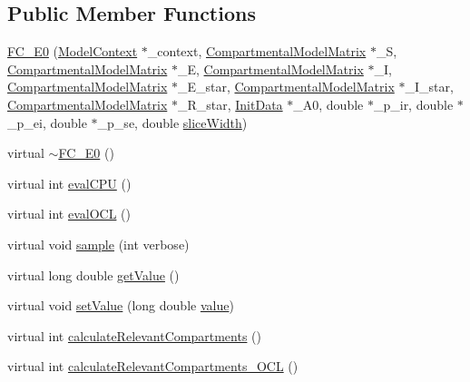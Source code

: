 \subsection*{Public Member Functions}
\begin{DoxyCompactItemize}
\item 
\hyperlink{classSpatialSEIR_1_1FC__E0_af49361f736866374bc4d7c568c443da7}{F\-C\-\_\-\-E0} (\hyperlink{classSpatialSEIR_1_1ModelContext}{Model\-Context} $\ast$\-\_\-context, \hyperlink{classSpatialSEIR_1_1CompartmentalModelMatrix}{Compartmental\-Model\-Matrix} $\ast$\-\_\-\-S, \hyperlink{classSpatialSEIR_1_1CompartmentalModelMatrix}{Compartmental\-Model\-Matrix} $\ast$\-\_\-\-E, \hyperlink{classSpatialSEIR_1_1CompartmentalModelMatrix}{Compartmental\-Model\-Matrix} $\ast$\-\_\-\-I, \hyperlink{classSpatialSEIR_1_1CompartmentalModelMatrix}{Compartmental\-Model\-Matrix} $\ast$\-\_\-\-E\-\_\-star, \hyperlink{classSpatialSEIR_1_1CompartmentalModelMatrix}{Compartmental\-Model\-Matrix} $\ast$\-\_\-\-I\-\_\-star, \hyperlink{classSpatialSEIR_1_1CompartmentalModelMatrix}{Compartmental\-Model\-Matrix} $\ast$\-\_\-\-R\-\_\-star, \hyperlink{classSpatialSEIR_1_1InitData}{Init\-Data} $\ast$\-\_\-\-A0, double $\ast$\-\_\-p\-\_\-ir, double $\ast$\-\_\-p\-\_\-ei, double $\ast$\-\_\-p\-\_\-se, double \hyperlink{classSpatialSEIR_1_1FullConditional_a150ee031af8d086ad0a04b13630a110f}{slice\-Width})
\item 
virtual \hyperlink{classSpatialSEIR_1_1FC__E0_adc32c559bbb774d1c361a4f830856cb1}{$\sim$\-F\-C\-\_\-\-E0} ()
\item 
virtual int \hyperlink{classSpatialSEIR_1_1FC__E0_a6f38f6b04084d8cc9a94a360195e459c}{eval\-C\-P\-U} ()
\item 
virtual int \hyperlink{classSpatialSEIR_1_1FC__E0_a7470507101e662f3f0c1b1a6ab861089}{eval\-O\-C\-L} ()
\item 
virtual void \hyperlink{classSpatialSEIR_1_1FC__E0_a7b396dca06e12a96473d3bf2855a9dc7}{sample} (int verbose)
\item 
virtual long double \hyperlink{classSpatialSEIR_1_1FC__E0_aa2681b2dc4378d162dd2c68ff5333288}{get\-Value} ()
\item 
virtual void \hyperlink{classSpatialSEIR_1_1FC__E0_a44355906ac90df5dff3e0b7ffc62e23b}{set\-Value} (long double \hyperlink{classSpatialSEIR_1_1FC__E0_a79d0c47dfdb185a65082c6685cd5b149}{value})
\item 
virtual int \hyperlink{classSpatialSEIR_1_1FC__E0_accae19c302cdd306fdfebf3a76c84c11}{calculate\-Relevant\-Compartments} ()
\item 
virtual int \hyperlink{classSpatialSEIR_1_1FC__E0_aab40abc211ff8095a6ed0ec0b0c48b51}{calculate\-Relevant\-Compartments\-\_\-\-O\-C\-L} ()
\end{DoxyCompactItemize}
